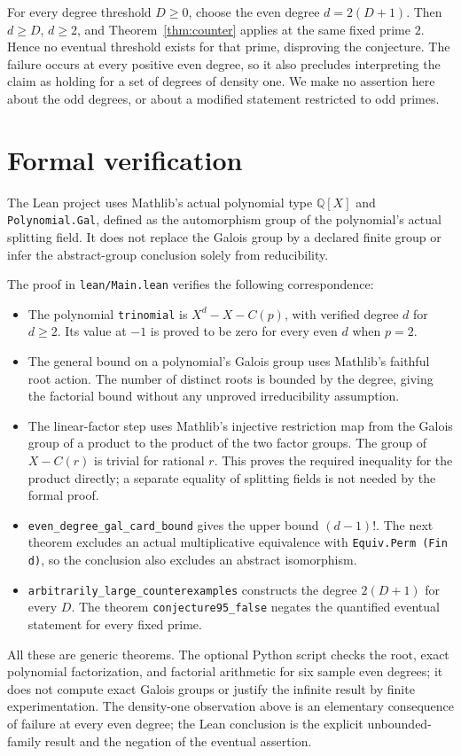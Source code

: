 \documentclass[11pt]{article}
\newcommand{\Q}{\mathbb Q}
\begin{document}
For every degree threshold $D\ge0$, choose the even degree $d=2(D+1)$. Then $d\ge D$, $d\ge2$, and Theorem~\ref{thm:counter} applies at the same fixed prime $2$. Hence no eventual threshold exists for that prime, disproving the conjecture. The failure occurs at every positive even degree, so it also precludes interpreting the claim as holding for a set of degrees of density one. We make no assertion here about the odd degrees, or about a modified statement restricted to odd primes.

\section*{Formal verification}
The Lean project uses Mathlib's actual polynomial type $\Q[X]$ and \texttt{Polynomial.Gal}, defined as the automorphism group of the polynomial's actual splitting field. It does not replace the Galois group by a declared finite group or infer the abstract-group conclusion solely from reducibility.

The proof in \texttt{lean/Main.lean} verifies the following correspondence:
\begin{itemize}
\item The polynomial \texttt{trinomial} is $X^d-X-C(p)$, with verified degree $d$ for $d\ge2$. Its value at $-1$ is proved to be zero for every even $d$ when $p=2$.
\item The general bound on a polynomial's Galois group uses Mathlib's faithful root action. The number of distinct roots is bounded by the degree, giving the factorial bound without any unproved irreducibility assumption.
\item The linear-factor step uses Mathlib's injective restriction map from the Galois group of a product to the product of the two factor groups. The group of $X-C(r)$ is trivial for rational $r$. This proves the required inequality for the product directly; a separate equality of splitting fields is not needed by the formal proof.
\item \texttt{even\_degree\_gal\_card\_bound} gives the upper bound $(d-1)!$. The next theorem excludes an actual multiplicative equivalence with \texttt{Equiv.Perm (Fin d)}, so the conclusion also excludes an abstract isomorphism.
\item \texttt{arbitrarily\_large\_counterexamples} constructs the degree $2(D+1)$ for every $D$. The theorem \texttt{conjecture95\_false} negates the quantified eventual statement for every fixed prime.
\end{itemize}
All these are generic theorems. The optional Python script checks the root, exact polynomial factorization, and factorial arithmetic for six sample even degrees; it does not compute exact Galois groups or justify the infinite result by finite experimentation. The density-one observation above is an elementary consequence of failure at every even degree; the Lean conclusion is the explicit unbounded-family result and the negation of the eventual assertion.
\end{document}
